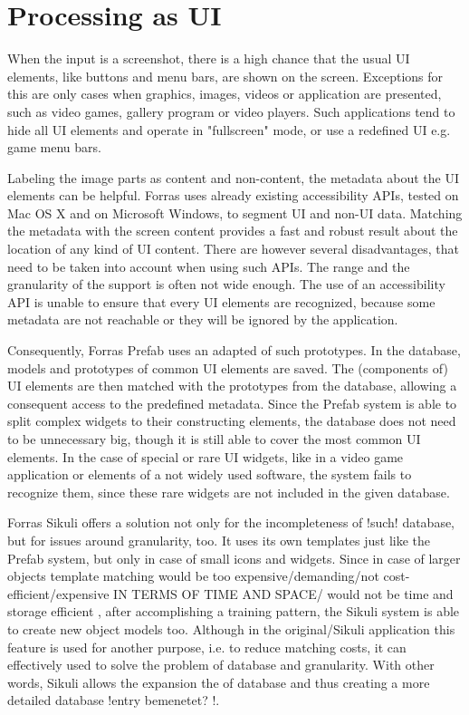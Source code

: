 \documentclass[draft,final]{vutinfth} %
\begin{document}
\section{Processing as UI}
When the input is a screenshot, there is a high chance that the usual UI elements, like buttons and menu bars, are shown on the screen.
Exceptions for this are only cases when graphics, images, videos or application are presented, such as video games, gallery program or video players.
Such applications tend to hide all UI elements and operate in "fullscreen" mode, or use a redefined UI e.g. game menu bars.\par
Labeling the image parts as content and non-content, the metadata about the UI elements can be helpful.
Forras uses already existing accessibility APIs, tested on Mac OS X and on Microsoft Windows, to segment UI and non-UI data. 
Matching the metadata with the screen content provides a fast and robust result about the location of any kind of UI content.
There are however several disadvantages, that need to be taken into account when using such APIs.
The range and the granularity of the support is often not wide enough.
The use of an accessibility API is unable to ensure that every UI elements are recognized, because some metadata are not reachable or they will be ignored by the application.\par
Consequently, Forras Prefab uses an adapted of such prototypes. 
In the database, models and  prototypes of common UI elements are saved.
The (components of) UI elements are then matched with the prototypes from the database, allowing a consequent access to the predefined metadata.
Since the Prefab system is able to split complex widgets to their constructing elements, the database does not need to be unnecessary big, though it is still able to cover the most common UI elements.
In the case of special or rare UI widgets, like in a video game application or elements of a not widely used software, the system fails to recognize them, since these rare widgets are not included in the given database.\par
Forras Sikuli offers a solution not only for the incompleteness of !such! database, but for issues around granularity, too.
It uses its own templates just like the Prefab system, but only in case of small icons and widgets.
Since in case of larger objects template matching would be too expensive/demanding/not cost-efficient/expensive IN TERMS OF TIME AND SPACE/ would not be time and storage efficient , after accomplishing a training pattern, the Sikuli system is able to create new object models too.
Although in the original/Sikuli application this feature is used for another purpose, i.e. to reduce matching costs, it can effectively used to solve the problem of database and granularity.
With other words, Sikuli allows the expansion the of database and thus creating a more detailed database !entry bemenetet? !.\par
\end{document}
